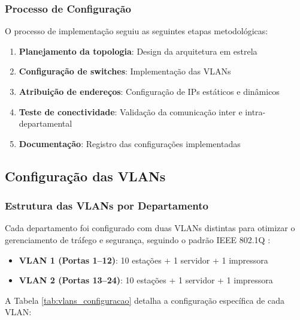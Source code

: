 \subsubsection{Processo de Configuração}

O processo de implementação seguiu as seguintes etapas metodológicas:

\begin{enumerate}
    \item \textbf{Planejamento da topologia}: Design da arquitetura em estrela
    \item \textbf{Configuração de switches}: Implementação das VLANs
    \item \textbf{Atribuição de endereços}: Configuração de IPs estáticos e dinâmicos
    \item \textbf{Teste de conectividade}: Validação da comunicação inter e intra-departamental
    \item \textbf{Documentação}: Registro das configurações implementadas
\end{enumerate}

\subsection{Configuração das VLANs}

\subsubsection{Estrutura das VLANs por Departamento}

Cada departamento foi configurado com duas VLANs distintas para otimizar o gerenciamento de tráfego e segurança, seguindo o padrão IEEE 802.1Q \cite{ieee8021q}:

\begin{itemize}
    \item \textbf{VLAN 1 (Portas 1--12)}: 10 estações + 1 servidor + 1 impressora
    \item \textbf{VLAN 2 (Portas 13--24)}: 10 estações + 1 servidor + 1 impressora
\end{itemize}

A Tabela \ref{tab:vlans_configuracao} detalha a configuração específica de cada VLAN:

